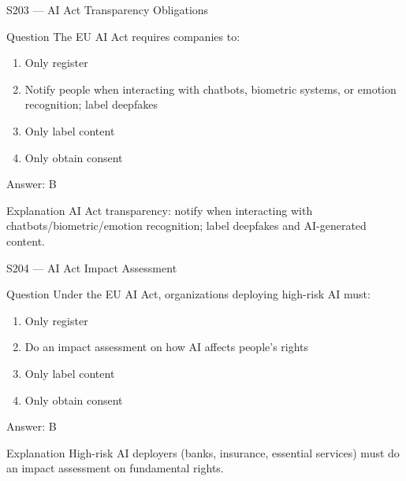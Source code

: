 \documentclass[aspectratio=169,8pt]{beamer}
\begin{document}
	\begin{frame}{S203 --- AI Act Transparency Obligations}
		\begin{block}{Question}
			The EU AI Act requires companies to:
			\begin{enumerate}
				\item Only register
				\item Notify people when interacting with chatbots, biometric systems, or emotion recognition; label deepfakes
				\item Only label content
				\item Only obtain consent
			\end{enumerate}
		\end{block}
		\begin{exampleblock}{Answer: B}\end{exampleblock}
		\begin{block}{Explanation}
			AI Act transparency: notify when interacting with chatbots/biometric/emotion recognition; label deepfakes and AI-generated content.
		\end{block}
	\end{frame}
	
	\begin{frame}{S204 --- AI Act Impact Assessment}
		\begin{block}{Question}
			Under the EU AI Act, organizations deploying high-risk AI must:
			\begin{enumerate}
				\item Only register
				\item Do an impact assessment on how AI affects people's rights
				\item Only label content
				\item Only obtain consent
			\end{enumerate}
		\end{block}
		\begin{exampleblock}{Answer: B}\end{exampleblock}
		\begin{block}{Explanation}
			High-risk AI deployers (banks, insurance, essential services) must do an impact assessment on fundamental rights.
		\end{block}
	\end{frame}
	
\end{document}
